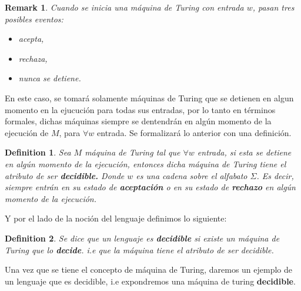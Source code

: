 \documentclass[10pt]{report}
\newtheorem*{remark}{Remark}
\newtheorem{definition}{Definition}
\begin{document}
    \begin{remark}
        Cuando se inicia una máquina de Turing con entrada $w$, pasan tres posibles eventos:
        \begin{itemize}
            \item acepta,
            \item rechaza,
            \item nunca se detiene.
        \end{itemize}
    \end{remark}
    En este caso, se tomará solamente máquinas de Turing que se detienen en algun momento en la ejucución para todas sus entradas,
    por lo tanto en términos formales, dichas máquinas siempre se dentendrán en algún momento de la
    ejecución de $M$, para $\forall w$ entrada.
    Se formalizará lo anterior con una definición.
    \begin{definition}
        Sea $M$ máquina de Turing tal que $\forall w$ entrada, si esta se detiene en algún momento de la ejecución,
        entonces dicha máquina de Turing tiene el atributo de ser
        \textbf{decidible.}\newline
        Donde $w$ es una cadena sobre el alfabato $\Sigma$.
        Es decir, siempre entrán en su estado de \textbf{aceptación}
        o en su estado de \textbf{rechazo} en algún momento de la ejecución.
    \end{definition}
    Y por el lado de la noción del lenguaje definimos lo siguiente:
    \begin{definition}
        Se dice que un lenguaje es \textbf{decidible} si existe un máquina de Turing
        que lo \textbf{decide}.
        i.e que la máquina tiene el atributo de ser decidible.
    \end{definition}
    Una vez que se tiene el concepto de máquina de Turing, daremos un ejemplo de un lenguaje que es decidible,
    i.e expondremos una máquina de turing \textbf{decidible}.
\end{document}
